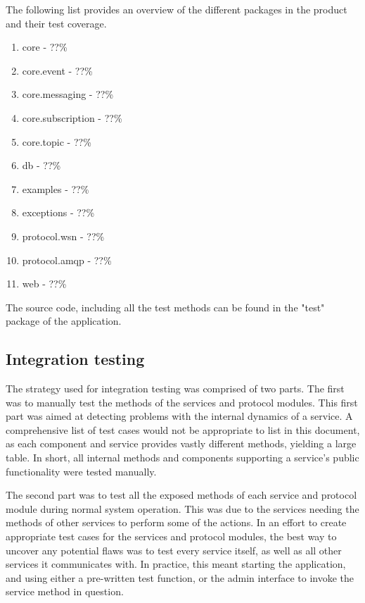 The following list provides an overview of the different packages in the product and their test coverage.

\begin{enumerate}
\item core - ??\%
\item core.event - ??\%
\item core.messaging - ??\%
\item core.subscription - ??\%
\item core.topic - ??\%
\item db - ??\%
\item examples - ??\%
\item exceptions - ??\%
\item protocol.wsn - ??\%
\item protocol.amqp - ??\%
\item web - ??\%
\end{enumerate}

The source code, including all the test methods can be found in the "test" package of the application.

\subsection{Integration testing}
\label{subsec:testing-test_execution-integration_testing}

The strategy used for integration testing was comprised of two parts. The first was to manually test the methods of the services and protocol modules. This first part was aimed at detecting problems with the internal dynamics of a service. A comprehensive list of test cases would not be appropriate to list in this document, as each component and service provides vastly different methods, yielding a large table. In short, all internal methods and components supporting a service's public functionality were tested manually.

The second part was to test all the exposed methods of each service and protocol module during normal system operation. This was due to the services needing the methods of other services to perform some of the actions. In an effort to create appropriate test cases for the services and protocol modules, the best way to uncover any potential flaws was to test every service itself, as well as all other services it communicates with. In practice, this meant starting the application, and using either a pre-written test function, or the admin interface to invoke the service method in question.

